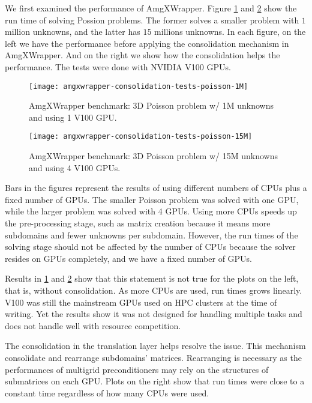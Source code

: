 
We first examined the performance of AmgXWrapper.
Figure \ref{fig:amgxwrapper-cons-1M} and \ref{fig:amgxwrapper-cons-15M} show the run time of solving Possion problems.
The former solves a smaller problem with $1$ million unknowns, and the latter has $15$ millions unknowns.
In each figure, on the left we have the performance before applying the consolidation mechanism in AmgXWrapper.
And on the right we show how the consolidation helps the performance.
The tests were done with NVIDIA V100 GPUs.

\begin{figure}[H]%
    \texttt{[image: amgxwrapper-consolidation-tests-poisson-1M]}%
    \caption{AmgXWrapper benchmark: 3D Poisson problem w/ 1M unknowns and using 1 V100 GPU.}\label{fig:amgxwrapper-cons-1M}%
\end{figure}

\begin{figure}[H]%
    \texttt{[image: amgxwrapper-consolidation-tests-poisson-15M]}%
    \caption{AmgXWrapper benchmark: 3D Poisson problem w/ 15M unknowns and using 4 V100 GPUs.}\label{fig:amgxwrapper-cons-15M}%
\end{figure}

Bars in the figures represent the results of using different numbers of CPUs plus a fixed number of GPUs.
The smaller Poisson problem was solved with one GPU, while the larger problem was solved with 4 GPUs.
Using more CPUs speeds up the pre-processing stage, such as matrix creation because it means more subdomains and fewer unknowns per subdomain.
However, the run times of the solving stage should not be affected by the number of CPUs because the solver resides on GPUs completely, and we have a fixed number of GPUs.

Results in \ref{fig:amgxwrapper-cons-1M} and \ref{fig:amgxwrapper-cons-15M} show that this statement is not true for the plots on the left, that is, without consolidation. 
As more CPUs are used, run times grows linearly.
V100 was still the mainstream GPUs used on HPC clusters at the time of writing.
Yet the results show it was not designed for handling multiple tasks and does not handle well with resource competition.

The consolidation in the translation layer helps resolve the issue.
This mechanism consolidate and rearrange subdomains' matrices.
Rearranging is necessary as the performances of multigrid preconditioners may rely on the structures of submatrices on each GPU.
Plots on the right show that run times were close to a constant time regardless of how many CPUs were used.

